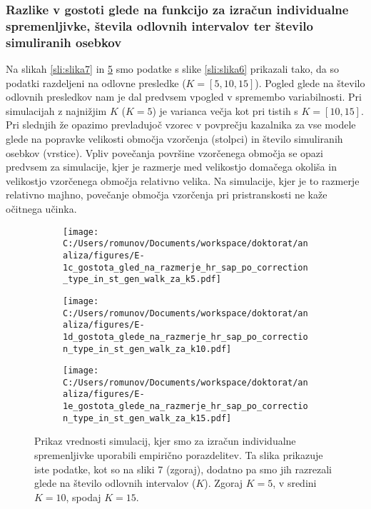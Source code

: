 \subsubsection{Razlike v gostoti glede na funkcijo za izračun individualne spremenljivke, števila odlovnih intervalov ter število simuliranih osebkov}
Na slikah \ref{sli:slika7} in \ref{sli:slika8} smo podatke s slike \ref{sli:slika6} prikazali tako, da so podatki razdeljeni na odlovne presledke ($K = [5, 10, 15]$). Pogled glede na število odlovnih presledkov nam je dal predvsem vpogled v spremembo variabilnosti. Pri simulacijah z najnižjim $K$ ($K = 5$) je varianca večja kot pri tistih s $K = [10, 15]$. Pri slednjih že opazimo prevladujoč vzorec v povprečju kazalnika za vse modele glede na popravke velikosti območja vzorčenja (stolpci) in število simuliranih osebkov (vrstice). Vpliv povečanja površine vzorčenega območja se opazi predvsem za simulacije, kjer je razmerje med velikostjo domačega okoliša in velikostjo vzorčenega območja relativno velika. Na simulacije, kjer je to razmerje relativno majhno, povečanje območja vzorčenja pri pristranskosti ne kaže očitnega učinka.

\begin{figure}[H]
  \centering
  \begin{subfigure}[b]{1\textwidth}
    \centering
    \texttt{[image: C:/Users/romunov/Documents/workspace/doktorat/analiza/figures/E-1c\_gostota\_gled\_na\_razmerje\_hr\_sap\_po\_correction\_type\_in\_st\_gen\_walk\_za\_k5.pdf]}
    \label{sli:sub8.1}
  \end{subfigure}

  \begin{subfigure}[b]{1\textwidth}
    \centering
    \texttt{[image: C:/Users/romunov/Documents/workspace/doktorat/analiza/figures/E-1d\_gostota\_glede\_na\_razmerje\_hr\_sap\_po\_correction\_type\_in\_st\_gen\_walk\_za\_k10.pdf]}
    \label{sli:sub8.2}
  \end{subfigure}
\end{figure}

\begin{figure}[H]
  \ContinuedFloat
  \begin{subfigure}[b]{1\textwidth}
    \centering
    \texttt{[image: C:/Users/romunov/Documents/workspace/doktorat/analiza/figures/E-1e\_gostota\_glede\_na\_razmerje\_hr\_sap\_po\_correction\_type\_in\_st\_gen\_walk\_za\_k15.pdf]}
    \label{sli:sub8.3}
  \end{subfigure}
  \caption[Prikaz vrednosti simulacij, kjer smo za izračun individualne spremenljivke uporabili empirično porazdelitev]{Prikaz vrednosti simulacij, kjer smo za izračun individualne spremenljivke uporabili empirično porazdelitev. Ta slika prikazuje iste podatke, kot so na sliki 7 (zgoraj), dodatno pa smo jih razrezali glede na število odlovnih intervalov ($K$). Zgoraj $K=5$, v sredini $K=10$, spodaj $K=15$.}
  \label{sli:slika8}
\end{figure}

